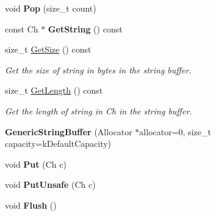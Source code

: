 \begin{DoxyCompactItemize}
\item 
void {\bfseries Pop} (size\+\_\+t count)\hypertarget{class_generic_string_buffer_a0038e53ba03c271bc4cbbac403ec4de4}{}\label{class_generic_string_buffer_a0038e53ba03c271bc4cbbac403ec4de4}

\item 
const Ch $\ast$ {\bfseries Get\+String} () const \hypertarget{class_generic_string_buffer_a42ed917a29012d932802f2709e11c572}{}\label{class_generic_string_buffer_a42ed917a29012d932802f2709e11c572}

\item 
size\+\_\+t \hyperlink{class_generic_string_buffer_abd04725d776322157be3381f5559c40b}{Get\+Size} () const \hypertarget{class_generic_string_buffer_abd04725d776322157be3381f5559c40b}{}\label{class_generic_string_buffer_abd04725d776322157be3381f5559c40b}

\begin{DoxyCompactList}\small\item\em Get the size of string in bytes in the string buffer. \end{DoxyCompactList}\item 
size\+\_\+t \hyperlink{class_generic_string_buffer_a8ad04ebc2bbe46a116613d1ed0d1eeff}{Get\+Length} () const \hypertarget{class_generic_string_buffer_a8ad04ebc2bbe46a116613d1ed0d1eeff}{}\label{class_generic_string_buffer_a8ad04ebc2bbe46a116613d1ed0d1eeff}

\begin{DoxyCompactList}\small\item\em Get the length of string in Ch in the string buffer. \end{DoxyCompactList}\item 
{\bfseries Generic\+String\+Buffer} (Allocator $\ast$allocator=0, size\+\_\+t capacity=k\+Default\+Capacity)\hypertarget{class_generic_string_buffer_a62f5ea1a53a2a3f98088f8c152b6183e}{}\label{class_generic_string_buffer_a62f5ea1a53a2a3f98088f8c152b6183e}

\item 
void {\bfseries Put} (Ch c)\hypertarget{class_generic_string_buffer_a8be5c8fadccacdcf40e20220f38e0afa}{}\label{class_generic_string_buffer_a8be5c8fadccacdcf40e20220f38e0afa}

\item 
void {\bfseries Put\+Unsafe} (Ch c)\hypertarget{class_generic_string_buffer_a9225468d11fdddfc3a9a4e48bf4d3ba4}{}\label{class_generic_string_buffer_a9225468d11fdddfc3a9a4e48bf4d3ba4}

\item 
void {\bfseries Flush} ()\hypertarget{class_generic_string_buffer_a28bb539487db17b07314a532f3b8847c}{}\label{class_generic_string_buffer_a28bb539487db17b07314a532f3b8847c}


\end{DoxyCompactItemize}
